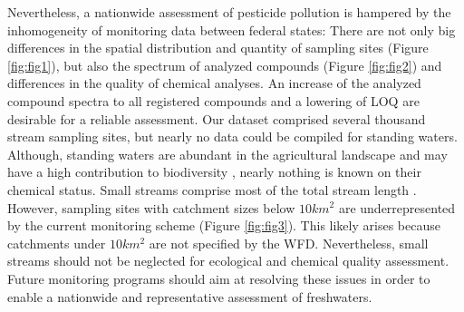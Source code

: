 \documentclass[journal=esthag,manuscript=article]{achemso}
\begin{document}
Nevertheless, a nationwide assessment of pesticide pollution is hampered by the inhomogeneity of monitoring data between federal states:
There are not only big differences in the spatial distribution and quantity of sampling sites (Figure \ref{fig:fig1}), but also the spectrum of analyzed compounds (Figure \ref{fig:fig2}) and differences in the quality of chemical analyses. 
%
%
An increase of the analyzed compound spectra to all registered compounds and a lowering of LOQ are desirable for a reliable assessment.
%
%
Our dataset comprised several thousand stream sampling sites, but nearly no data could be compiled for standing waters. 
%
%
Although, standing waters are abundant in the agricultural landscape and may have a high contribution to biodiversity \citep{davies_comparison_2008}, nearly nothing is known on their chemical status.
Small streams comprise most of the total stream length \citep{nadeau_hydrological_2007}.
However, sampling sites with catchment sizes below $10km^2$ are underrepresented by the current monitoring scheme (Figure \ref{fig:fig3}).
This likely arises because catchments under $10km^2$ are not specified by the WFD.
%
%
%
Nevertheless, small streams should not be neglected for ecological and chemical quality assessment.
Future monitoring programs should aim at resolving these issues in order to enable a nationwide and representative assessment of freshwaters. 
%
%
\end{document}
